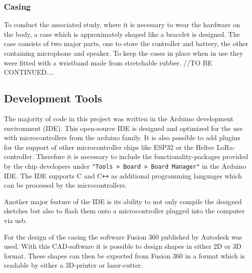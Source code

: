 \subsubsection{Casing}
To conduct the associated study, where it is necessary to wear the hardware on the body, a case which is approximately shaped like a bracelet is designed.
The case consists of two major parts, one to store the controller and battery, the other containing microphone and speaker.
To keep the cases in place when in use they were fitted with a wristband made from stretchable rubber.
//TO BE CONTINUED....

\subsection{Development Tools}
The majority of code in this project was written in the Arduino development environment (IDE). 
This open-source IDE is designed and optimized for the use with microcontrollers from the arduino family.
It is also possible to add plugins for the support of other microcontroller chips like ESP32 or the Heltec LoRa-controller.
Therefore it is necessary to include the functionality-packages provided by the chip developers under \texttt{"Tools > Board > Board Manager"} in the Arduino IDE.
The IDE supports C and C\texttt{++} as additional programming languages which can be processed by the microcontrollers.

Another major feature of the IDE is its ability to not only compile the designed sketches but also to flash them onto a microcontroller plugged into the computer via usb.

For the design of the casing the software Fusion 360 published by Autodesk was used.
With this CAD-software it is possible to design shapes in either 2D or 3D format.
These shapes can then be exported from Fusion 360 in a format which is readable by either a 3D-printer or laser-cutter.
 

